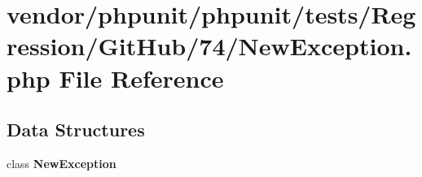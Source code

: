 \section{vendor/phpunit/phpunit/tests/\+Regression/\+Git\+Hub/74/\+New\+Exception.php File Reference}
\label{_new_exception_8php}
\subsection*{Data Structures}
\begin{DoxyCompactItemize}
\item 
class {\bf New\+Exception}
\end{DoxyCompactItemize}
